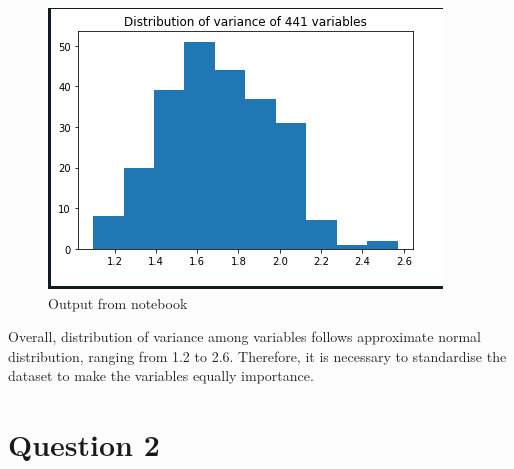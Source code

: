 \documentclass{article}
\begin{document}
\begin{figure}[H]
    \centering
    \includegraphics[]{hist var.png}
    \caption{Output from notebook}
    \label{fig:hist var}
\end{figure}
Overall, distribution of variance among variables follows approximate normal distribution, ranging from 1.2 to 2.6. Therefore, it is necessary to standardise the dataset to make the variables equally importance.

\section{Question 2}
\end{document}
